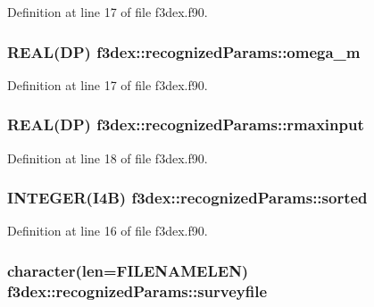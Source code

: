 Definition at line 17 of file f3dex.f90.

\hypertarget{typef3dex_1_1recognized_params_a2b7f4ea83a970a3c93fa9bdde6f8e0d0}{
\subsubsection[{omega\_\-m}]{\setlength{\rightskip}{0pt plus 5cm}REAL(DP) {\bf f3dex::recognizedParams::omega\_\-m}}}
\label{typef3dex_1_1recognized_params_a2b7f4ea83a970a3c93fa9bdde6f8e0d0}


Definition at line 17 of file f3dex.f90.

\hypertarget{typef3dex_1_1recognized_params_acb096ab9ba6742393d065da8f0616f84}{
\subsubsection[{rmaxinput}]{\setlength{\rightskip}{0pt plus 5cm}REAL(DP) {\bf f3dex::recognizedParams::rmaxinput}}}
\label{typef3dex_1_1recognized_params_acb096ab9ba6742393d065da8f0616f84}


Definition at line 18 of file f3dex.f90.

\hypertarget{typef3dex_1_1recognized_params_a10ab9998ddb51c3bf0ea4a51e6196f88}{
\subsubsection[{sorted}]{\setlength{\rightskip}{0pt plus 5cm}INTEGER(I4B) {\bf f3dex::recognizedParams::sorted}}}
\label{typef3dex_1_1recognized_params_a10ab9998ddb51c3bf0ea4a51e6196f88}


Definition at line 16 of file f3dex.f90.

\hypertarget{typef3dex_1_1recognized_params_ae790f95a6f12d6150a22bcc04e0ffa52}{
\subsubsection[{surveyfile}]{\setlength{\rightskip}{0pt plus 5cm}character(len=FILENAMELEN) {\bf f3dex::recognizedParams::surveyfile}}}
\label{typef3dex_1_1recognized_params_ae790f95a6f12d6150a22bcc04e0ffa52}


